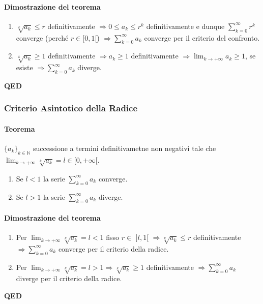 \documentclass{article}
\newcommand{\N}{\mathbb{N}}
\begin{document}
\paragraph{{Dimostrazione del teorema}}
\begin{enumerate}
    \item $\sqrt[k]{a_k}\leq r$ definitivamente $\Rightarrow 0 \leq a_k \leq r^k$ definitivamente e dunque $\sum_{k=0}^{\infty} r^k$ converge (perché $r \in [0,1[$) $\Rightarrow \sum_{k=0}^{\infty} a_k$ converge per il criterio del confronto.
    \item $\sqrt[k]{a_k} \geq 1$ definitivamente $\Rightarrow a_k \geq 1$ definitivamente $\Rightarrow \lim_{k \rightarrow + \infty} a_k \geq 1$, se esiste $\Rightarrow \sum_{k=0}^{\infty} a_k$ diverge. 
\end{enumerate}
\begin{flushright}
\textbf{QED}
\end{flushright}

\subsubsection{{Criterio Asintotico della Radice}}
\paragraph{{Teorema}}
$\{a_k\}_{k \in \N}$ successione a termini definitivametne non negativi tale che $\lim_{k \rightarrow +\infty} \sqrt[k]{a_k} = l \in [0,+\infty[$.
\begin{enumerate}
    \item Se $l<1$ la serie $ \sum_{k=0}^{\infty} a_k$ converge.
    \item Se $l> 1$ la serie $\sum_{k=0}^{\infty} a_k$ diverge.
\end{enumerate}

\paragraph{{Dimostrazione del teorema}}
\begin{enumerate}
    \item Per $\lim_{k \rightarrow +\infty} \sqrt[k]{a_k} = l < 1$ fisso $r\in \,\,]l,1[\,\, \Rightarrow \sqrt[k]{a_k} \leq r$  definitivamente $\Rightarrow \sum_{k=0}^{\infty} a_k$ converge per il criterio della radice.
    \item Per $\lim_{k \rightarrow +\infty} \sqrt[k]{a_k} = l > 1 \Rightarrow \sqrt[k]{a_k}\geq 1$ definitivamente  $\Rightarrow \sum_{k=0}^{\infty} a_k$ diverge per il criterio della radice.
\end{enumerate}
\begin{flushright}
\textbf{QED}
\end{flushright}
\end{document}
